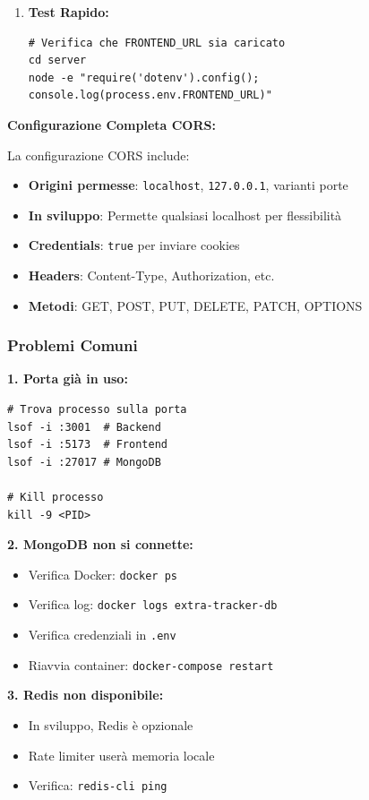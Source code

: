 \documentclass[11pt,a4paper]{article}
\newcommand{\code}[1]{\texttt{#1}}
\begin{document}
\begin{enumerate}
    \item \textbf{Test Rapido:}
    \begin{lstlisting}
# Verifica che FRONTEND_URL sia caricato
cd server
node -e "require('dotenv').config(); console.log(process.env.FRONTEND_URL)"
    \end{lstlisting}
\end{enumerate}

\textbf{Configurazione Completa CORS:}

La configurazione CORS include:
\begin{itemize}
    \item \textbf{Origini permesse}: \code{localhost}, \code{127.0.0.1}, varianti porte
    \item \textbf{In sviluppo}: Permette qualsiasi localhost per flessibilità
    \item \textbf{Credentials}: \code{true} per inviare cookies
    \item \textbf{Headers}: Content-Type, Authorization, etc.
    \item \textbf{Metodi}: GET, POST, PUT, DELETE, PATCH, OPTIONS
\end{itemize}

\subsubsection{Problemi Comuni}

\textbf{1. Porta già in uso:}
\begin{lstlisting}
# Trova processo sulla porta
lsof -i :3001  # Backend
lsof -i :5173  # Frontend
lsof -i :27017 # MongoDB

# Kill processo
kill -9 <PID>
\end{lstlisting}

\textbf{2. MongoDB non si connette:}
\begin{itemize}
    \item Verifica Docker: \code{docker ps}
    \item Verifica log: \code{docker logs extra-tracker-db}
    \item Verifica credenziali in \code{.env}
    \item Riavvia container: \code{docker-compose restart}
\end{itemize}

\textbf{3. Redis non disponibile:}
\begin{itemize}
    \item In sviluppo, Redis è opzionale
    \item Rate limiter userà memoria locale
    \item Verifica: \code{redis-cli ping}
\end{itemize}
\end{document}
